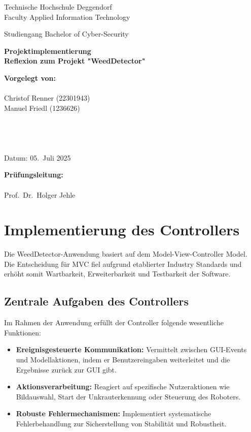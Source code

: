 \documentclass[12pt, a4paper]{scrreprt}
\newcommand{\faculty}{Faculty Applied Information Technology}
\newcommand{\studies}{Bachelor of Cyber-Security}
\newcommand{\thesistitleDE}{Projektimplementierung \\ Reflexion zum Projekt "WeedDetector"}
\newcommand{\submissiondate}{05.\ Juli 2025}
\newcommand{\supervisor}{Prof.\ Dr.\ Holger Jehle}
\begin{document}
\begin{titlepage}
  \centering
  {\LARGE Technische Hochschule Deggendorf \\ \faculty \par}
  \vspace{0.3cm}
  {\Large Studiengang \studies \\[1.5cm]}
  {\Huge\bfseries \thesistitleDE\par}
  \vfill
  \begin{minipage}[t]{0.45\textwidth}
    \textbf{Vorgelegt von:}\\
    \\
    Christof Renner (22301943)\\
    Manuel Friedl (1236626)\\
    \\
    \\
    \\
    \\
    Datum: \submissiondate
  \end{minipage}\hfill
  \begin{minipage}[t]{0.45\textwidth}
    \textbf{Prüfungsleitung:}\\
    \\
    \supervisor
  \end{minipage}
\end{titlepage}

\tableofcontents
\newpage

\chapter{Implementierung des Controllers}

Die WeedDetector-Anwendung basiert auf dem Model-View-Controller Model. Die Entscheidung für MVC fiel aufgrund etablierter Industry Standards und erhöht somit Wartbarkeit, Erweiterbarkeit und Testbarkeit der Software.

\section{Zentrale Aufgaben des Controllers}

Im Rahmen der Anwendung erfüllt der Controller folgende wesentliche Funktionen:

\begin{itemize}
    \item \textbf{Ereignisgesteuerte Kommunikation:} Vermittelt zwischen GUI-Events und Modellaktionen, indem er Benutzereingaben weiterleitet und die Ergebnisse zurück zur GUI gibt.
    \item \textbf{Aktionsverarbeitung:} Reagiert auf spezifische Nutzeraktionen wie Bildauswahl, Start der Unkrauterkennung oder Steuerung des Roboters.
    \item \textbf{Robuste Fehlermechanismen:} Implementiert systematische Fehlerbehandlung zur Sicherstellung von Stabilität und Robustheit.
\end{itemize}
\end{document}
